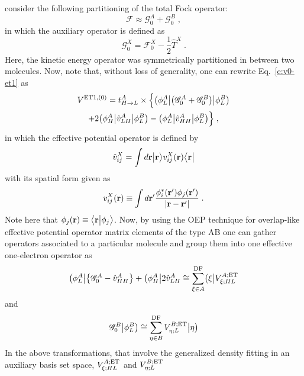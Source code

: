 consider the following partitioning of the total Fock operator:
%
\begin{equation}
 \mathscr{F} \approx \mathscr{G}^{A}_0 + \mathscr{G}^{B}_0 \;,
\end{equation}
%
in which the auxiliary operator is defined as
%
\begin{equation}
 \mathscr{G}^{X}_0 = \mathscr{F}^{X}_0 - \frac{1}{2}\hat{T}^{X} \;.
\end{equation}
%
Here, the kinetic energy operator was symmetrically partitioned in between two molecules.
%
Now,
note that, without loss of generality, one can rewrite Eq.~\eqref{e:v0-et1}
as
%
\begin{multline}
 V^{{\rm ET1},(0)} = t_{H\rightarrow L}^A \times \Big\{ 
 \tbraket{\phi_L^A}{\left( \mathscr{G}^A_0 + \mathscr{G}^B_0 \right)}{\phi_L^B} \\
  + 2 \tbraket{\phi_H^A}{\hat{v}_{LH}^A}{\phi_L^B}
  -   \tbraket{\phi_L^A}{\hat{v}_{HH}^A}{\phi_L^B}
 \Big\} \;,
\end{multline}
%
in which the effective potential operator\cite{Blasiak.Bednarska.Choluj.Bartkowiak.XXXX} is defined by
%
\begin{equation}
 \hat{v}_{ij}^X = \int d{\bf r} \Ket{{\bf r}} v_{ij}^X({\bf r})
 \Bra{{\bf r}}
\end{equation}
%
with its spatial form given as
%
\begin{equation}
 v_{ij}^X({\bf r}) \equiv \int d{\bf r}' \frac{\phi_i^*({\bf r}') \phi_j({\bf r}') }{\vert {\bf r} - {\bf r}'\vert} \;.
\end{equation}
%
Note here that $\phi_j({\bf r}) \equiv \BraKet{{\bf r}}{\phi_j}$.
Now, 
by using the OEP technique\cite{Blasiak.Bednarska.Choluj.Bartkowiak.XXXX}
for overlap\hyp{}like effective potential operator matrix elements of the type AB
one can gather operators associated to a particular molecule and group them
into one effective one\hyp{}electron operator
as
%
\begin{equation}
 \bra{\phi_L^A} \left\{ \mathscr{G}_0^A - \hat{v}^A_{HH} \right\}
 + \bra{\phi_H^A} 2 \hat{v}^A_{LH} 
 \cong \sum_{\xi\in A}^{\rm DF} \bra{\xi} V^{A;{\rm ET}}_{\xi;HL}
\end{equation}
%
and
%
\begin{equation}
 \mathscr{G}_0^B \ket{\phi_L^B} \cong \sum_{\eta\in B}^{\rm DF} V^{B;{\rm ET}}_{\eta;L} \ket{\eta} 
\end{equation}
%
In the above transformations, that involve the generalized density fitting
in an auxiliary basis set space,
$V^{A;{\rm ET}}_{\xi;HL}$ and $V^{B;{\rm ET}}_{\eta;L}$
